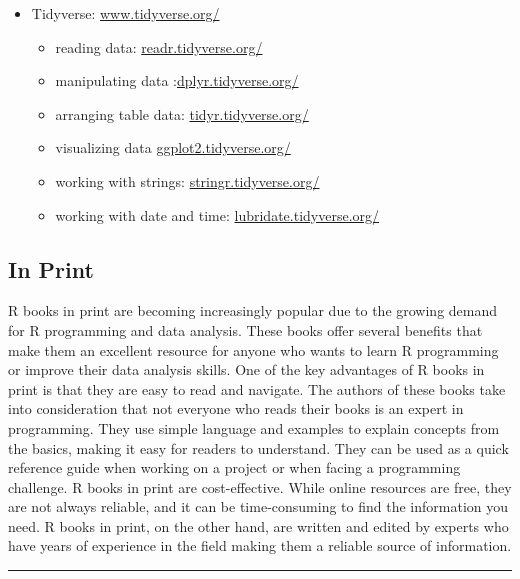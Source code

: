 \documentclass[
]{book}
\begin{document}
\begin{itemize}
\item
  Tidyverse: \href{https://www.tidyverse.org/}{www.tidyverse.org/}

  \begin{itemize}
  \item
    reading data: \href{https://readr.tidyverse.org/}{readr.tidyverse.org/}
  \item
    manipulating data :\href{https://dplyr.tidyverse.org/}{dplyr.tidyverse.org/}
  \item
    arranging table data: \href{https://tidyr.tidyverse.org/}{tidyr.tidyverse.org/}
  \item
    visualizing data \href{https://ggplot2.tidyverse.org/}{ggplot2.tidyverse.org/}
  \item
    working with strings: \href{https://stringr.tidyverse.org/}{stringr.tidyverse.org/}
  \item
    working with date and time: \href{https://lubridate.tidyverse.org/}{lubridate.tidyverse.org/}
  \end{itemize}
\end{itemize}

\hypertarget{in-print}{%
\subsection*{In Print}\label{in-print}}

R books in print are becoming increasingly popular due to the growing demand for R programming and data analysis. These books offer several benefits that make them an excellent resource for anyone who wants to learn R programming or improve their data analysis skills. One of the key advantages of R books in print is that they are easy to read and navigate. The authors of these books take into consideration that not everyone who reads their books is an expert in programming. They use simple language and examples to explain concepts from the basics, making it easy for readers to understand. They can be used as a quick reference guide when working on a project or when facing a programming challenge. R books in print are cost-effective. While online resources are free, they are not always reliable, and it can be time-consuming to find the information you need. R books in print, on the other hand, are written and edited by experts who have years of experience in the field making them a reliable source of information.

\begin{center}\rule{0.5\linewidth}{0.5pt}\end{center}
\end{document}
